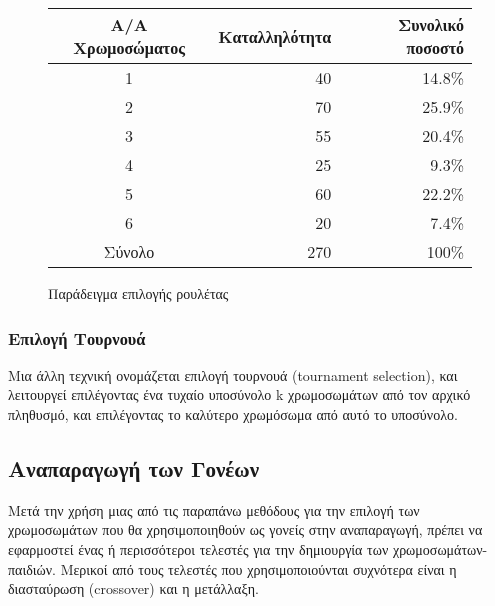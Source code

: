 \begin{figure}[!t]
    \centering
    \begin{tabular}{@{}crr@{}}
        \toprule
        Α/Α Χρωμοσώματος & Καταλληλότητα & Συνολικό ποσοστό \\ \midrule
        1                & 40            & 14.8\%           \\
        2                & 70            & 25.9\%           \\
        3                & 55            & 20.4\%           \\
        4                & 25            & 9.3\%            \\
        5                & 60            & 22.2\%           \\
        6                & 20            & 7.4\%            \\ \midrule
        Σύνολο           & 270           & 100\%            \\ \bottomrule
    \end{tabular}


    \caption{Παράδειγμα επιλογής ρουλέτας}
    \label{fig_rouletteWheel}
\end{figure}

\subsubsection{Επιλογή Τουρνουά}

Μια άλλη τεχνική ονομάζεται επιλογή τουρνουά (tournament selection), και λειτουργεί επιλέγοντας ένα τυχαίο υποσύνολο k χρωμοσωμάτων από τον αρχικό πληθυσμό, και επιλέγοντας το καλύτερο χρωμόσωμα από αυτό το υποσύνολο.

\subsection{Αναπαραγωγή των Γονέων}

Μετά την χρήση μιας από τις παραπάνω μεθόδους για την επιλογή των χρωμοσωμάτων που θα χρησιμοποιηθούν ως γονείς στην αναπαραγωγή, πρέπει να εφαρμοστεί ένας ή περισσότεροι τελεστές για την δημιουργία των χρωμοσωμάτων-παιδιών. Μερικοί από τους τελεστές που χρησιμοποιούνται συχνότερα είναι η διασταύρωση (crossover) και η μετάλλαξη.

